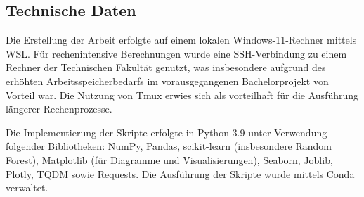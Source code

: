 \subsection{Technische Daten}

Die Erstellung der Arbeit erfolgte auf einem lokalen Windows-11-Rechner mittels WSL. Für rechenintensive Berechnungen 
wurde eine SSH-Verbindung zu einem Rechner der Technischen Fakultät genutzt, was insbesondere aufgrund 
des erhöhten Arbeitsspeicherbedarfs im vorausgegangenen Bachelorprojekt von Vorteil war. Die Nutzung von 
Tmux erwies sich als vorteilhaft für die Ausführung längerer Rechenprozesse.

Die Implementierung der Skripte erfolgte in Python 3.9 unter Verwendung folgender Bibliotheken: NumPy, 
Pandas, scikit-learn (insbesondere Random Forest), Matplotlib (für Diagramme und Visualisierungen), 
Seaborn, Joblib, Plotly, TQDM sowie Requests. Die Ausführung der Skripte wurde mittels Conda verwaltet.




